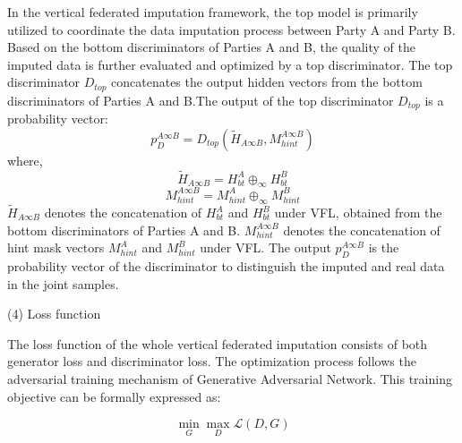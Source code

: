 \documentclass[final,1p,times]{elsarticle}
\begin{document}
In the vertical federated imputation framework, the top model is primarily utilized to coordinate the data imputation process between Party A and Party B. Based on the bottom discriminators of Parties A and B, the quality of the imputed data is further evaluated and optimized by a top discriminator. The top discriminator $D_{top}$ concatenates the output hidden vectors from the bottom discriminators of Parties A and B.The output of the top discriminator $D_{top}$ is a probability vector:
\begin{equation}
	p_D^{A\infty B}=D_{top}\left(\tilde{H}_{A\infty B},M_{hint}^{A\infty B}\right)
\end{equation}
where,
\begin{equation}
	\widetilde{H}_{A\infty B}=H_{bt}^A\oplus_\infty H_{bt}^B
\end{equation}
\begin{equation}
	M_{hint}^{A\infty B}=M_{hint}^A\oplus_\infty M_{hint}^B
\end{equation}
$\tilde{H}_{A\infty B}$ denotes the concatenation of $H_{bt}^A$ and $H_{bt}^B$ under VFL, obtained from the bottom discriminators of Parties A and B. $M_{hint}^{A\infty B}$ denotes the concatenation of hint mask vectors $M_{hint}^A$ and $M_{hint}^B$ under VFL. The output $p_D^{A\infty B}$ is the probability vector of the discriminator to distinguish the imputed and real data in the joint samples.

(4) Loss function

The loss function of the whole vertical federated imputation consists of both generator loss and discriminator loss. The optimization process follows the adversarial training mechanism of Generative Adversarial Network. This training objective can be formally expressed as:

\begin{equation}
	\min_G\max_D\mathcal{L}(D,G)
\end{equation}
\end{document}
